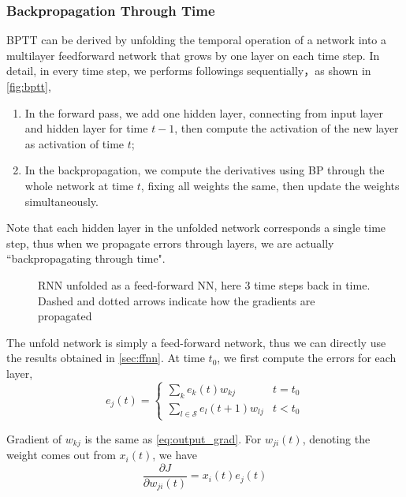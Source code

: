 \documentclass[12pt]{article}
\numberwithin{equation}{section}
\begin{document}
\subsubsection{Backpropagation Through Time}
BPTT\cite{Williams90anefficient} can be derived by unfolding the temporal operation of a network into a 
multilayer feedforward network that grows by one layer on each time step. In detail, in every time step, we
performs followings sequentially，as shown in \autoref{fig:bptt},
\begin{enumerate}
\item In the forward pass, we add one hidden layer, connecting from input layer and hidden layer for time $t-1$,
         then compute the activation of the new layer as activation of time $t$;
\item In the backpropagation, we compute the derivatives using BP through the whole network at time $t$, 
         fixing all weights the same, then update the weights simultaneously.
\end{enumerate}
Note that each hidden layer in the unfolded network corresponds a single time step, thus when we
propagate errors through layers, we are actually ``backpropagating through time".

\begin{figure}[ht]
\begin{center}
  
  
  \caption{RNN unfolded as a feed-forward NN, here 3 time steps back in time. 
                Dashed and dotted arrows indicate how the gradients are propagated}
  \label{fig:bptt}
\end{center}
\end{figure}

The unfold network is simply a feed-forward network, thus we can directly use the results obtained in \autoref{sec:ffnn}.
 At time $t_0$, we first compute the errors for each layer,
\begin{equation}
      e_j(t) = \left\{\begin{array}{ll}
                                    \sum_k{e_k(t) w_{kj}} &  t=t_0  \\
                                    \sum_{l \in \mathcal{S}}{e_l(t + 1) w_{lj}} &  t < t_0 
                          \end{array} \right.
\end{equation}

Gradient of $w_{kj}$ is the same as \eqref{eq:output_grad}.
For $w_{ji}(t)$, denoting the weight comes out from $x_i(t)$, we have
\begin{equation}
    \frac{\partial J}{\partial w_{ji}(t)} = x_i(t)e_j(t)
\end{equation}
\end{document}
